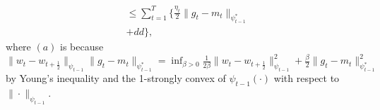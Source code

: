 \documentclass[11pt]{article}
\makeatletter
\renewenvironment{proof}[1][\proofname]{%
   \par\pushQED{\qed}\normalfont%
   \topsep6\p@\@plus6\p@\relax
   \trivlist\item[\hskip\labelsep\bfseries#1]%
   \ignorespaces
}{%
   \popQED\endtrivlist\@endpefalse
}
\theoremstyle{k}
\makeatother
\begin{document}
\begin{proof}
\begin{equation}
\begin{aligned}
& \leq \sum_{t=1}^T \Big\{ \frac{\eta_t}{2} \| g_t - m_t  \|_{\psi_{t-1}^*} \\
& + dd
\Big\},
\end{aligned}
\end{equation}
where $(a)$ is because
$
\| w_t - w_{t+\frac{1}{2} } \|_{\psi_{t-1}} \| g_t - m_t  \|_{\psi_{t-1}^*} = \inf_{ \beta > 0 }   \frac{1}{2\beta}
\| w_t - w_{t+\frac{1}{2} } \|_{\psi_{t-1}}^2 +
 \frac{\beta}{2} \| g_t - m_t  \|_{\psi_{t-1}^*}^2$ by Young's inequality and the 1-strongly convex of $\psi_{t-1}(\cdot)$ with respect to $\| \cdot \|_{\psi_{t-1}}$.
%

\end{proof}



\newpage
\end{document}
